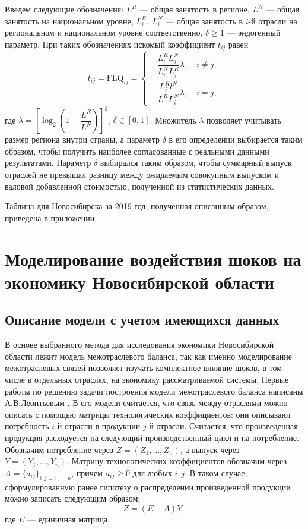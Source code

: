\documentclass[12pt, a4paper]{article}
\begin{document}
Введем следующие обозначения: $L^R$ --- общая занятость в регионе, $L^N$ --- общая занятость на национальном уровне, $L_i^R,\ L_i^N$ --- общая занятость в $i$-й отрасли на региональном и национальном уровне соответственно, $\delta \geqslant 1$ --- эндогенный параметр. При таких обозначениях искомый коэффициент $t_{ij}$ равен
$$
t_{ij} = \mathrm{FLQ}_{ij} = \left\{\begin{aligned}
& \dfrac{L_i^R L_j^N}{L_i^N L_j^R}\lambda,\quad i \neq j,\\
& \dfrac{L_i^R l^N}{L^R L_i^N}\lambda,\quad i=j,
\end{aligned}\right.
$$
где $\lambda = \left[\log_2\left(1 + \dfrac{L^R}{L^N}\right)\right]^\delta$, $\delta \in [0, 1]$. Множитель $\lambda$ позволяет
\cite{RassShan} учитывать размер региона внутри страны, а параметр $\delta$ в его определении выбирается таким образом, чтобы получить наиболее согласованные с реальными данными результатами. Параметр $\delta$ выбирался таким образом, чтобы суммарный выпуск отраслей не превышал разницу между ожидаемым совокупным выпуском и валовой добавленной стоимостью, полученной из статистических данных.

Таблица для Новосибирска за 2019 год, полученная описанным образом, приведена в приложении.

\section{Моделирование воздействия шоков на экономику Новосибирской области}
\subsection{Описание модели с учетом имеющихся данных}
В основе выбранного метода для исследования экономики Новосибирской области лежит модель межотраслевого баланса, так как именно моделирование межотраслевых связей позволяет изучать комплектное влияние шоков, в том числе в отдельных отраслях, на экономику рассматриваемой системы. Первые работы по решению задачи построения модели межотраслевого баланса написаны А.В.Леонтьевым \cite{Leontief}. В его модели считается, что связь между отраслями можно описать с помощью матрицы технологических коэффициентов: они описывают потребность $i$-й отрасли в продукции $j$-й отрасли. Считается, что произведенная продукция расходуется на следующий производственный цикл и на потребление. Обозначим потребление через $Z = (Z_1, \ldots, Z_n)$, а выпуск через $Y = (Y_1, \ldots, Y_n)$. Матрицу технологических коэффициентов обозначим через $A = \{a_{ij}\}_{i,j = 1, \ldots, n}$, причем $a_{ij} \geqslant 0$ для любых $i, j$. В таком случае, сформулированную ранее гипотезу о распределении произведенной продукции можно записать следующим образом:
$$
Z = (E - A)Y,
$$
где $E$ --- единичная матрица.
\end{document}
